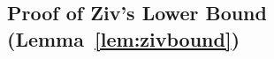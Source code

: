 \begin{subappendices}
%

  
  \section{Proof of Ziv's Lower Bound (Lemma~\ref{lem:zivbound})}
  \label{app:zivboundproof}


\end{subappendices}
